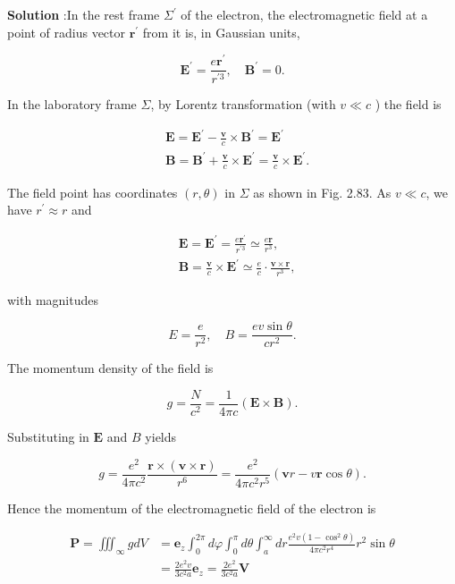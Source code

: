 \documentclass[10pt]{article}
\begin{document}
\textbf{Solution} :In the rest frame $\Sigma^{\prime}$ of the electron, the electromagnetic field at a point of radius vector $\mathbf{r}^{\prime}$ from it is, in Gaussian units,

$$
\mathbf{E}^{\prime}=\frac{e \mathbf{r}^{\prime}}{r^{\prime 3}}, \quad \mathbf{B}^{\prime}=0 .
$$

In the laboratory frame $\Sigma$, by Lorentz transformation (with $v \ll c$ ) the field is

$$
\begin{aligned}
&\mathbf{E}=\mathbf{E}^{\prime}-\frac{\mathbf{v}}{c} \times \mathbf{B}^{\prime}=\mathbf{E}^{\prime} \\
&\mathbf{B}=\mathbf{B}^{\prime}+\frac{\mathbf{v}}{c} \times \mathbf{E}^{\prime}=\frac{\mathbf{v}}{c} \times \mathbf{E}^{\prime} .
\end{aligned}
$$

The field point has coordinates $(r, \theta)$ in $\Sigma$ as shown in Fig. 2.83. As $v \ll c$, we have $r^{\prime} \approx r$ and

$$
\begin{aligned}
&\mathbf{E}=\mathbf{E}^{\prime}=\frac{e \mathbf{r}^{\prime}}{r^{\prime 3}} \simeq \frac{e \mathbf{r}}{r^{3}}, \\
&\mathbf{B}=\frac{\mathbf{v}}{c} \times \mathbf{E}^{\prime} \simeq \frac{e}{c} \cdot \frac{\mathbf{v} \times \mathbf{r}}{r^{3}},
\end{aligned}
$$

with magnitudes

$$
E=\frac{e}{r^{2}}, \quad B=\frac{e v \sin \theta}{c r^{2}} .
$$

 The momentum density of the field is

$$
g=\frac{N}{c^{2}}=\frac{1}{4 \pi c}(\mathbf{E} \times \mathbf{B}) .
$$

Substituting in $\mathbf{E}$ and $B$ yields

$$
g=\frac{e^{2}}{4 \pi c^{2}} \frac{\mathbf{r} \times(\mathbf{v} \times \mathbf{r})}{r^{6}}=\frac{e^{2}}{4 \pi c^{2} r^{5}}(\mathbf{v} r-v \mathbf{r} \cos \theta) .
$$

Hence the momentum of the electromagnetic field of the electron is

$$
\begin{aligned}
\mathbf{P}=\iiint_{\infty} g d V &=\mathbf{e}_{z} \int_{0}^{2 \pi} d \varphi \int_{0}^{\pi} d \theta \int_{a}^{\infty} d r \frac{e^{2} v\left(1-\cos ^{2} \theta\right)}{4 \pi c^{2} r^{4}} r^{2} \sin \theta \\
&=\frac{2 e^{2} v}{3 c^{2} a} \mathbf{e}_{z}=\frac{2 e^{2}}{3 c^{2} a} \mathbf{V}
\end{aligned}
$$
\end{document}
